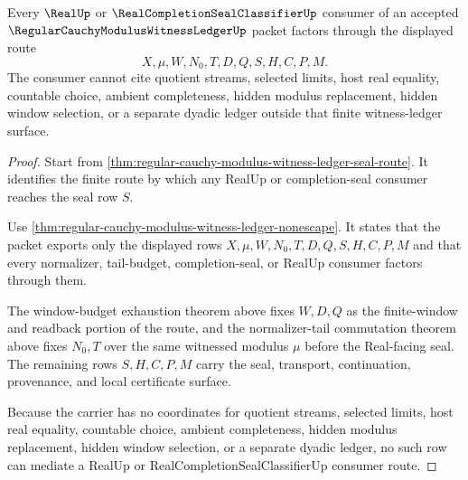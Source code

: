 \begin{theorem}
\label{thm:regular-cauchy-modulus-witness-ledger-real-seal-consumer-exactness}
Every $\RealUp$ or $\RealCompletionSealClassifierUp$ consumer of an accepted $\RegularCauchyModulusWitnessLedgerUp$ packet factors through the displayed route
$$
X,\mu,W,N_0,T,D,Q,S,H,C,P,M.
$$
The consumer cannot cite quotient streams, selected limits, host real equality, countable choice, ambient completeness, hidden modulus replacement, hidden window selection, or a separate dyadic ledger outside that finite witness-ledger surface.
\end{theorem}
\begin{proof}
Start from \autoref{thm:regular-cauchy-modulus-witness-ledger-seal-route}. It identifies the finite route by which any RealUp or completion-seal consumer reaches the seal row $S$.

Use \autoref{thm:regular-cauchy-modulus-witness-ledger-nonescape}. It states that the packet exports only the displayed rows $X,\mu,W,N_0,T,D,Q,S,H,C,P,M$ and that every normalizer, tail-budget, completion-seal, or RealUp consumer factors through them.

The window-budget exhaustion theorem above fixes $W,D,Q$ as the finite-window and readback portion of the route, and the normalizer-tail commutation theorem above fixes $N_0,T$ over the same witnessed modulus $\mu$ before the Real-facing seal. The remaining rows $S,H,C,P,M$ carry the seal, transport, continuation, provenance, and local certificate surface.

Because the carrier has no coordinates for quotient streams, selected limits, host real equality, countable choice, ambient completeness, hidden modulus replacement, hidden window selection, or a separate dyadic ledger, no such row can mediate a RealUp or RealCompletionSealClassifierUp consumer route.
\end{proof}

